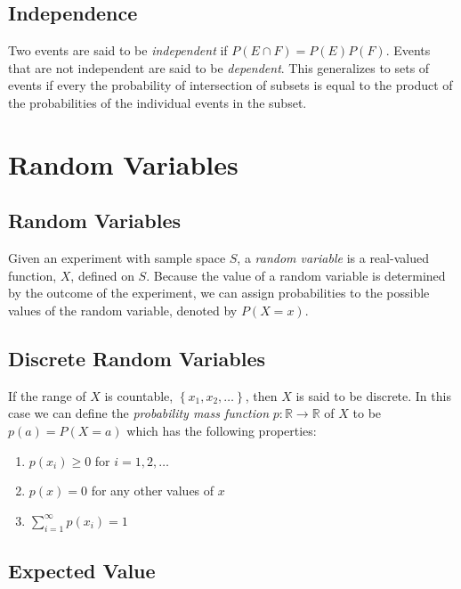 \documentclass[10pt]{article}
\theoremstyle{definition}
\theoremstyle{theorem}
\begin{document}
		\subsection*{Independence}
		
		Two events are said to be \emph{independent} if $P(E\cap F) = P(E)P(F)$. Events that are not independent are said to be \emph{dependent}.  This generalizes to sets of events if every the probability of intersection of subsets is equal to the product of the probabilities of the individual events in the subset.
		
		\section{Random Variables}
		
		\subsection*{Random Variables}
		
		Given an experiment with sample space $S$, a \emph{random variable} is a real-valued function, $X$, defined on $S$. Because the value of a random variable is determined by the outcome of the experiment, we can assign probabilities to the possible values of the random variable, denoted by $P(X=x)$.
		
		\subsection*{Discrete Random Variables}
		If the range of $X$ is countable, $\left\{ x_1, x_2, \ldots \right\}$, then $X$ is said to be discrete. In this case we can define the \emph{probability mass function} $p:\mathbb{R}\to\mathbb{R}$ of $X$ to be $p(a) = P(X=a)$ which has the following properties:
		\begin{multicols}{3}
			\begin{enumerate}
				\item $p(x_i) \geq 0$ for $i=1,2,\ldots$
				\item $p(x) = 0$ for any other values of $x$
				\item $\sum_{i=1}^{\infty}p(x_i) = 1$
			\end{enumerate}
		\end{multicols}
		
		\subsection*{Expected Value}
		
\end{document}
